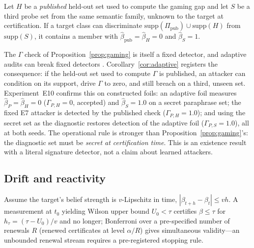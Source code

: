 \begin{corollary}\label{cor:adaptive}
Let $H$ be a \emph{published} held-out set used to compute the gaming gap and
let $S$ be a third probe set from the same semantic family, unknown to the
target at certification. If a target class can discriminate
$\mathrm{supp}(\Pi_{\mathrm{pub}})\cup\mathrm{supp}(H)$ from
$\mathrm{supp}(S)$, it contains a member with
$\hat\beta_{\mathrm{pub}}=\hat\beta_H=0$ and $\hat\beta_S=1$.
\end{corollary}

The $\Gamma$ check of Proposition~\ref{prop:gaming} is itself a fixed
detector, and adaptive audits can break fixed detectors
\cite{soopal2026,duddu2026}. Corollary~\ref{cor:adaptive} registers the
consequence: if the held-out set used to compute $\Gamma$ is published, an
attacker can condition on its support, drive $\Gamma$ to zero, and still
breach on a third, unseen set. Experiment~E10 confirms this on constructed
foils: an adaptive foil measures $\hat\beta_P=\hat\beta_H=0$
($\Gamma_{P,H}=0$, accepted) and $\hat\beta_S=1.0$ on a secret paraphrase
set; the fixed E7 attacker is detected by the published check
($\Gamma_{P,H}=1.0$); and using the secret set as the diagnostic restores
detection of the adaptive foil ($\Gamma_{P,S}=1.0$), all at both seeds. The
operational rule is stronger than Proposition~\ref{prop:gaming}'s: the
diagnostic set must be \emph{secret at certification time}. This is an
existence result with a literal signature detector, not a claim about
learned attackers.

\subsection{Drift and reactivity}\label{sec:drift}

\begin{proposition}\label{prop:halflife}
Assume the target's belief strength is $v$-Lipschitz in time,
$|\beta_{t+h}-\beta_t|\le vh$. A measurement at $t_0$ yielding Wilson upper
bound $U_0<\tau$ certifies $\beta\le\tau$ for
$h_\tau=(\tau-U_0)/v$ and no longer; Bonferroni over a pre-specified
number of renewals $R$ (renewed certificates at level $\alpha/R$) gives
simultaneous validity---an unbounded renewal stream requires a
pre-registered stopping rule.
\end{proposition}

